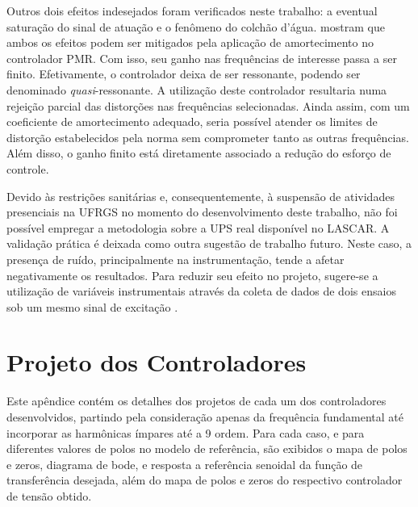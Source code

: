 \documentclass[repeatfields,oneside,overleaf]{tcc}
\begin{document}
Outros dois efeitos indesejados foram verificados neste trabalho: a eventual saturação do sinal de atuação e o fenômeno do colchão d'água.
\textcite{Keiel2017, Keiel2019, Bertoldi2019} mostram que ambos os efeitos podem ser mitigados pela aplicação de amortecimento no controlador PMR.
Com isso, seu ganho nas frequências de interesse passa a ser finito.
Efetivamente, o controlador deixa de ser ressonante, podendo ser denominado \textit{quasi}-ressonante.
A utilização deste controlador resultaria numa rejeição parcial das distorções nas frequências selecionadas.
Ainda assim, com um coeficiente de amortecimento adequado, seria possível atender os limites de distorção estabelecidos pela norma \textcite{IEC62040-3:2011} sem comprometer tanto as outras frequências.
Além disso, o ganho finito está diretamente associado a redução do esforço de controle.

Devido às restrições sanitárias e, consequentemente, à suspensão de atividades presenciais na UFRGS no momento do desenvolvimento deste trabalho, não foi possível empregar a metodologia sobre a UPS real disponível no LASCAR.
A validação prática é deixada como outra sugestão de trabalho futuro.
Neste caso, a presença de ruído, principalmente na instrumentação, tende a afetar negativamente os resultados.
Para reduzir seu efeito no projeto, sugere-se a utilização de variáveis instrumentais através da coleta de dados de dois ensaios sob um mesmo sinal de excitação \cite{Campi2000}.

\appendix

\chapter{Projeto dos Controladores}\label{app:varia_polo}

Este apêndice contém os detalhes dos projetos de cada um dos controladores desenvolvidos, partindo pela consideração apenas da frequência fundamental até incorporar as harmônicas ímpares até a 9{\textordfeminine} ordem.
Para cada caso, e para diferentes valores de polos no modelo de referência, são exibidos o mapa de polos e zeros, diagrama de bode, e resposta a referência senoidal da função de transferência desejada, além do mapa de polos e zeros do respectivo controlador de tensão obtido.
\end{document}
